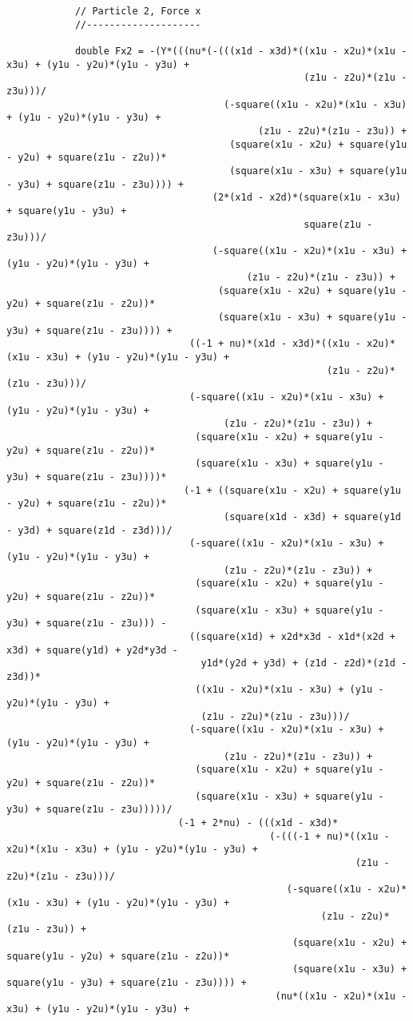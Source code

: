 \begin{lstlisting}
			// Particle 2, Force x
			//--------------------
			
			double Fx2 = -(Y*(((nu*(-(((x1d - x3d)*((x1u - x2u)*(x1u - x3u) + (y1u - y2u)*(y1u - y3u) + 
													(z1u - z2u)*(z1u - z3u)))/
									  (-square((x1u - x2u)*(x1u - x3u) + (y1u - y2u)*(y1u - y3u) + 
											(z1u - z2u)*(z1u - z3u)) + 
									   (square(x1u - x2u) + square(y1u - y2u) + square(z1u - z2u))*
									   (square(x1u - x3u) + square(y1u - y3u) + square(z1u - z3u)))) + 
									(2*(x1d - x2d)*(square(x1u - x3u) + square(y1u - y3u) + 
													square(z1u - z3u)))/
									(-square((x1u - x2u)*(x1u - x3u) + (y1u - y2u)*(y1u - y3u) + 
										  (z1u - z2u)*(z1u - z3u)) + 
									 (square(x1u - x2u) + square(y1u - y2u) + square(z1u - z2u))*
									 (square(x1u - x3u) + square(y1u - y3u) + square(z1u - z3u)))) + 
								((-1 + nu)*(x1d - x3d)*((x1u - x2u)*(x1u - x3u) + (y1u - y2u)*(y1u - y3u) + 
														(z1u - z2u)*(z1u - z3u)))/
								(-square((x1u - x2u)*(x1u - x3u) + (y1u - y2u)*(y1u - y3u) + 
									  (z1u - z2u)*(z1u - z3u)) + 
								 (square(x1u - x2u) + square(y1u - y2u) + square(z1u - z2u))*
								 (square(x1u - x3u) + square(y1u - y3u) + square(z1u - z3u))))*
							   (-1 + ((square(x1u - x2u) + square(y1u - y2u) + square(z1u - z2u))*
									  (square(x1d - x3d) + square(y1d - y3d) + square(z1d - z3d)))/
								(-square((x1u - x2u)*(x1u - x3u) + (y1u - y2u)*(y1u - y3u) + 
									  (z1u - z2u)*(z1u - z3u)) + 
								 (square(x1u - x2u) + square(y1u - y2u) + square(z1u - z2u))*
								 (square(x1u - x3u) + square(y1u - y3u) + square(z1u - z3u))) - 
								((square(x1d) + x2d*x3d - x1d*(x2d + x3d) + square(y1d) + y2d*y3d - 
								  y1d*(y2d + y3d) + (z1d - z2d)*(z1d - z3d))*
								 ((x1u - x2u)*(x1u - x3u) + (y1u - y2u)*(y1u - y3u) + 
								  (z1u - z2u)*(z1u - z3u)))/
								(-square((x1u - x2u)*(x1u - x3u) + (y1u - y2u)*(y1u - y3u) + 
									  (z1u - z2u)*(z1u - z3u)) + 
								 (square(x1u - x2u) + square(y1u - y2u) + square(z1u - z2u))*
								 (square(x1u - x3u) + square(y1u - y3u) + square(z1u - z3u)))))/
							  (-1 + 2*nu) - (((x1d - x3d)*
											  (-(((-1 + nu)*((x1u - x2u)*(x1u - x3u) + (y1u - y2u)*(y1u - y3u) + 
															 (z1u - z2u)*(z1u - z3u)))/
												 (-square((x1u - x2u)*(x1u - x3u) + (y1u - y2u)*(y1u - y3u) + 
													   (z1u - z2u)*(z1u - z3u)) + 
												  (square(x1u - x2u) + square(y1u - y2u) + square(z1u - z2u))*
												  (square(x1u - x3u) + square(y1u - y3u) + square(z1u - z3u)))) + 
											   (nu*((x1u - x2u)*(x1u - x3u) + (y1u - y2u)*(y1u - y3u) + 

\end{lstlisting}
